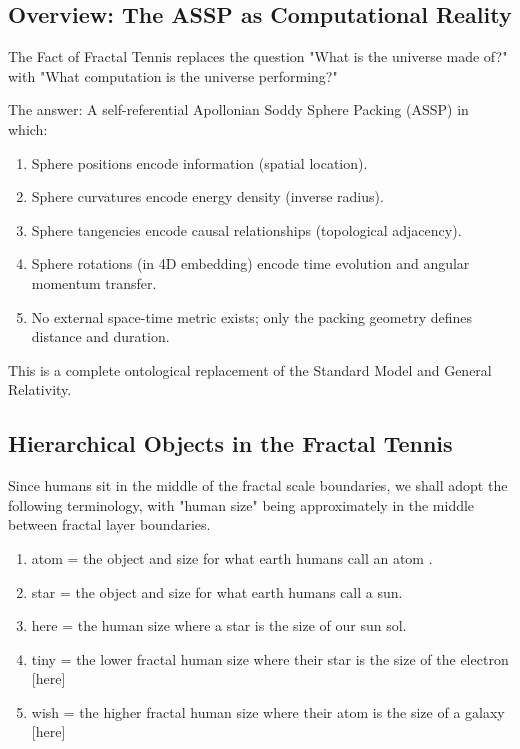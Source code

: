 \documentclass[11pt,a4paper]{article}
\begin{document}
  \subsection{Overview: The ASSP as Computational Reality}

    The Fact of Fractal Tennis replaces the question "What is the universe made of?" with "What computation is the universe performing?"

    The answer: A self-referential Apollonian Soddy Sphere Packing (ASSP) in which:
    \begin{enumerate}
    \item Sphere positions encode information (spatial location).
    \item Sphere curvatures encode energy density (inverse radius).
    \item Sphere tangencies encode causal relationships (topological adjacency).
    \item Sphere rotations (in 4D embedding) encode time evolution and angular momentum transfer.
    \item No external space-time metric exists; only the packing geometry defines distance and duration.
    \end{enumerate}

    This is a complete ontological replacement of the Standard Model and General Relativity.

  \subsection{Hierarchical Objects in the Fractal Tennis}
    Since humans sit in the middle of the fractal scale boundaries, we shall adopt the following terminology, with "human size" being approximately in the middle between fractal layer boundaries.
    \begin{enumerate}
    \item atom = the object and size for what earth humans call an atom .
    \item star = the object and size for what earth humans call a sun.
    \item here = the human size where a star is the size of our sun sol.
    \item tiny = the lower fractal human size where their star is the size of the electron [here]
    \item wish = the higher fractal human size where their atom is the size of a galaxy [here] 
    \end{enumerate}
\end{document}

